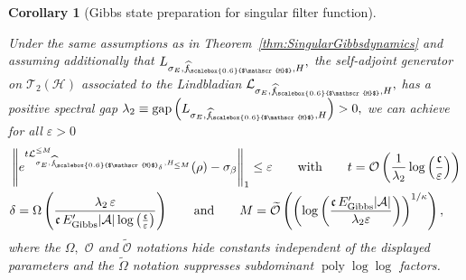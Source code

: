 \documentclass[11pt]{amsart}
\newcommand{\nn}{\nonumber}
\newcommand{\1}{\mathbbm{1}}
\newcommand{\cH}{\mathcal{H}}
\newcommand{\cL}{\mathcal{L}}
\newcommand{\eps}{\varepsilon}
\newcommand{\cA}{\mathcal{A}}
\newcommand{\hatfM}{\widehat{f}_{\!\scalebox{0.6}{$\mathscr{M}$}}
}
\newcommand{\hatfMdelta}{\widehat{f}_{\!\scalebox{0.6}{$\mathscr{M}$}_\delta}}
\theoremstyle{plain}
\newtheorem{corollary}[theorem]{Corollary}
\theoremstyle{definition}
\theoremstyle{remark}
\numberwithin{equation}{section}
\begin{document}
\begin{corollary}[Gibbs state preparation for singular filter function]\label{cor:SingularGibbs}

Under the same assumptions as in Theorem~\ref{thm:SingularGibbsdynamics} and assuming additionally that $L_{\sigma_E,\hatfM,H},$ the self-adjoint generator on $\mathscr{T}_2(\cH)$ associated to the Lindbladian $\cL_{\sigma_E,\hatfM,H},$ has a positive spectral gap 
$\lambda_2 \equiv \operatorname{gap}\left(L_{\sigma_E,\hatfM,H}\right) >0,$ we can achieve for all $\eps>0$
\begin{align}\nn&\left\|e^{t\cL^{\le M}_{\sigma_E,\hatfMdelta,H_{\le M}}}(\rho) - \sigma_\beta\right\|_1 \le \eps\qquad
\text{with} \qquad t=\mathcal{O}\left(\frac{1}{\lambda_2}\log\left(\frac{\mathfrak{c}}{\eps}\right)\right) \\&\delta=\Omega\left(\frac{\lambda_2\,\eps}{\mathfrak{c}\,E'_{\operatorname{Gibbs}}|\cA|\log\left(\frac{\mathfrak{c}}{\eps}\right)} \right) \qquad\text{and}\qquad M = \widetilde{\mathcal{O}}\left(\left(\log\left(\frac{\mathfrak{c}\,E'_{\operatorname{Gibbs}}|\cA|}{\lambda_2 \eps}\right)\right)^{1/\kappa}\right),
\end{align}
where the $\Omega,$ $\mathcal{O}$ and $\widetilde{\mathcal{O}}$ notations hide constants independent of the displayed parameters and the $\widetilde \Omega$ notation suppresses subdominant $\operatorname{poly}\log\log$ factors.


\end{corollary}
\end{document}
